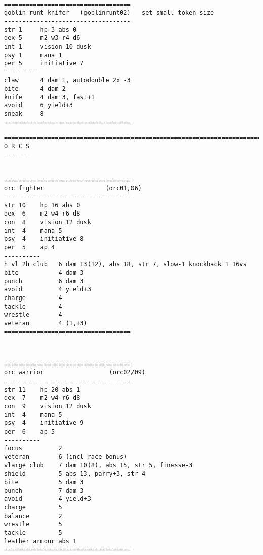 \

\pagebreak[1]
\tiny \begin{samepage} \begin{verbatim}
===================================
goblin runt knifer   (goblinrunt02)   set small token size
-----------------------------------
str 1     hp 3 abs 0
dex 5     m2 w3 r4 d6
int 1     vision 10 dusk
psy 1     mana 1
per 5     initiative 7
----------
claw      4 dam 1, autodouble 2x -3
bite      4 dam 2
knife     4 dam 3, fast+1
avoid     6 yield+3
sneak     8
===================================
\end{verbatim} \end{samepage} \normalsize








\pagebreak[2]
\tiny \begin{samepage} \begin{verbatim}
================================================================================
O R C S
-------


===================================
orc fighter                 (orc01,06)
-----------------------------------
str 10    hp 16 abs 0
dex  6    m2 w4 r6 d8
con  8    vision 12 dusk
int  4    mana 5
psy  4    initiative 8
per  5    ap 4
----------
h vl 2h club   6 dam 13(12), abs 18, str 7, slow-1 knockback 1 16vs
bite           4 dam 3
punch          6 dam 3
avoid          4 yield+3
charge         4
tackle         4
wrestle        4
veteran        4 (1,+3)
===================================
\end{verbatim} \end{samepage} \normalsize

\

\pagebreak[1]
\tiny \begin{samepage} \begin{verbatim}
===================================
orc warrior                  (orc02/09)
-----------------------------------
str 11    hp 20 abs 1
dex  7    m2 w4 r6 d8
con  9    vision 12 dusk
int  4    mana 5
psy  4    initiative 9
per  6    ap 5
----------
focus          2
veteran        6 (incl race bonus)
vlarge club    7 dam 10(8), abs 15, str 5, finesse-3
shield         5 abs 13, parry+3, str 4
bite           5 dam 3
punch          7 dam 3
avoid          4 yield+3
charge         5
balance        2
wrestle        5
tackle         5
leather armour abs 1
===================================
\end{verbatim} \end{samepage} \normalsize

